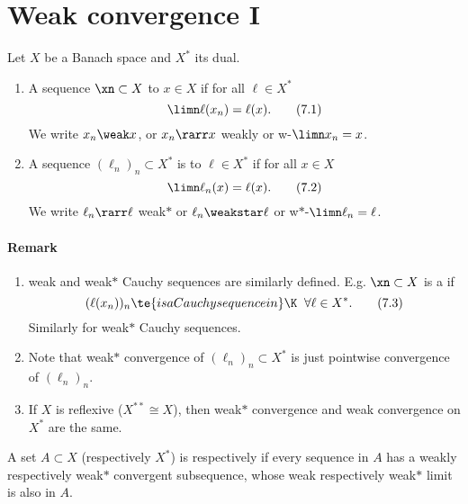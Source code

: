 \section{Weak convergence I}
\begin{definition}\label{vii.1}
    Let $X$ be a Banach space and $X^*$ its dual.
    \begin{enumerate}[label=\alph*)]
        \item \label{vii.1.a}A sequence $\xn\subset X$  to $x\in X$ if for all $\ell\in X^*$
        \[\limn\ell(x_n)=\ell(x).\tag{7.1}\label{7.1}\]
        We write $x_n\weak x$, or $x_n\rarr x$ weakly or w-$\limn x_n=x$.
        \item \label{vii.1.b}A sequence $(\ell_n)_n\subset X^*$ is  to $\ell\in X^*$ if for all $x\in X$
        \[\limn\ell_n(x)=\ell(x).\tag{7.2}\label{7.2}\]
        We write $\ell_n\rarr\ell$ weak$\ast$ or $\ell_n\weakstar\ell$ or w$\ast$-$\limn\ell_n=\ell$.
    \end{enumerate}
\end{definition}

\paragraph{Remark}
\begin{enumerate}[label=\arabic*)]
    \item weak and weak$\ast$ Cauchy sequences are similarly defined. E.g. $\xn\subset X$ is a  if 
    \[(\ell(x_n))_n \te{ is a Cauchy sequence in }\K\;\;\forall\ell\in X^*.\tag{7.3}\label{7.3}\]
    Similarly for weak$\ast$ Cauchy sequences.
    
    \item Note that weak$\ast$ convergence of $(\ell_n)_n\subset X^*$ is just pointwise convergence of $(\ell_n)_n$.
    
    \item If $X$ is reflexive ($X^{\ast\ast}\cong X$), then weak$\ast$ convergence and weak convergence on $X^*$ are the same.
\end{enumerate}

\begin{definition}
    A set $A\subset X$ (respectively $X^*$) is  \rec{(}respectively \rec{)} if every sequence in $A$ has a weakly \rec{(}respectively weak$\ast$\rec{)} convergent subsequence, whose weak \rec{(}respectively weak$\ast$\rec{)} limit is also in $A$.
\end{definition}


